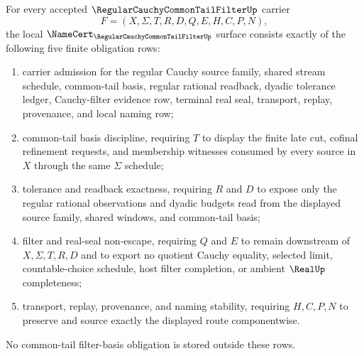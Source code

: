 \begin{theorem}
\label{thm:regular-cauchy-common-tail-filter-namecert-obligations}
For every accepted $\RegularCauchyCommonTailFilterUp$ carrier
$$
F=(X,\Sigma,T,R,D,Q,E,H,C,P,N),
$$
the local $\NameCert_{\RegularCauchyCommonTailFilterUp}$ surface consists exactly of the following five finite obligation rows:
\begin{enumerate}
\item carrier admission for the regular Cauchy source family, shared stream schedule, common-tail basis, regular rational readback, dyadic tolerance ledger, Cauchy-filter evidence row, terminal real seal, transport, replay, provenance, and local naming row;
\item common-tail basis discipline, requiring $T$ to display the finite late cut, cofinal refinement requests, and membership witnesses consumed by every source in $X$ through the same $\Sigma$ schedule;
\item tolerance and readback exactness, requiring $R$ and $D$ to expose only the regular rational observations and dyadic budgets read from the displayed source family, shared windows, and common-tail basis;
\item filter and real-seal non-escape, requiring $Q$ and $E$ to remain downstream of $X,\Sigma,T,R,D$ and to export no quotient Cauchy equality, selected limit, countable-choice schedule, host filter completion, or ambient $\RealUp$ completeness;
\item transport, replay, provenance, and naming stability, requiring $H,C,P,N$ to preserve and source exactly the displayed route componentwise.
\end{enumerate}
No common-tail filter-basis obligation is stored outside these rows.
\end{theorem}

